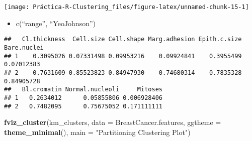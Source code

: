 \documentclass[]{article}
\newenvironment{Shaded}{\begin{snugshade}}{\end{snugshade}}
\newcommand{\CommentTok}[1]{\textcolor[rgb]{0.56,0.35,0.01}{\textit{#1}}}
\newcommand{\DataTypeTok}[1]{\textcolor[rgb]{0.13,0.29,0.53}{#1}}
\newcommand{\DecValTok}[1]{\textcolor[rgb]{0.00,0.00,0.81}{#1}}
\newcommand{\KeywordTok}[1]{\textcolor[rgb]{0.13,0.29,0.53}{\textbf{#1}}}
\newcommand{\NormalTok}[1]{#1}
\newcommand{\OperatorTok}[1]{\textcolor[rgb]{0.81,0.36,0.00}{\textbf{#1}}}
\newcommand{\StringTok}[1]{\textcolor[rgb]{0.31,0.60,0.02}{#1}}
\providecommand{\tightlist}{%
  \setlength{\itemsep}{0pt}\setlength{\parskip}{0pt}}
\begin{document}
\begin{center}\texttt{[image: Práctica-R-Clustering\_files/figure-latex/unnamed-chunk-15-1]} \end{center}

\begin{itemize}
\tightlist
\item
  c(``range'', ``YeoJohnson'')
\end{itemize}

\begin{Shaded}
\end{Shaded}

\begin{verbatim}
##   Cl.thickness  Cell.size Cell.shape Marg.adhesion Epith.c.size Bare.nuclei
## 1    0.3095026 0.07331498 0.09953216    0.09924841    0.3955499  0.07012383
## 2    0.7631609 0.85523823 0.84947930    0.74680314    0.7835328  0.84905728
##   Bl.cromatin Normal.nucleoli     Mitoses
## 1   0.2634012      0.05855806 0.006928406
## 2   0.7482095      0.75675052 0.171111111
\end{verbatim}

\begin{Shaded}
\begin{Highlighting}[]
\KeywordTok{fviz_cluster}\NormalTok{(km_clusters, }\DataTypeTok{data =}\NormalTok{ BreastCancer.features,}
             \DataTypeTok{ggtheme =} \KeywordTok{theme_minimal}\NormalTok{(),}
             \DataTypeTok{main =} \StringTok{"Partitioning Clustering Plot"}\NormalTok{)}
\end{Highlighting}
\end{Shaded}
\end{document}
